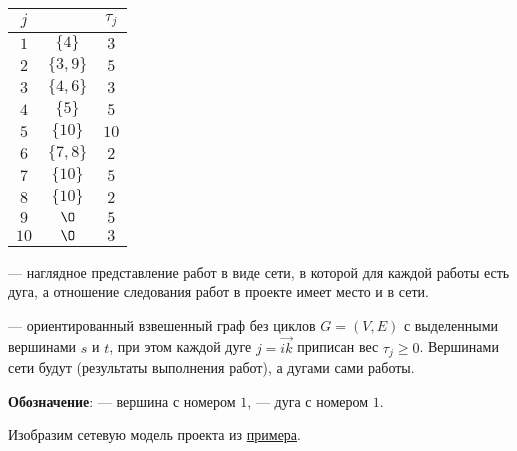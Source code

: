 \begin{table}[H]
	\centering
	\begin{tabular}{ | c | c | c | } 
		\hline
		$j$ & \text{следующие работы} & $\tau_j$ \\ \hline
		$1$ & $\{4\}$ & $3$ \\ \hline
		$2$ & $\{3, 9\}$ & $5$ \\ \hline
		$3$ & $\{4, 6\}$ & $3$ \\ \hline
		$4$ & $\{5\}$ & $5$ \\ \hline
		$5$ & $\{10\}$ & $10$ \\ \hline
		$6$ & $\{7, 8\}$ & $2$ \\ \hline
		$7$ & $\{10\}$ & $5$ \\ \hline
		$8$ & $\{10\}$ & $2$ \\ \hline
		$9$ & $\O$ & $5$ \\ \hline
		$10$ & $\O$ & $3$ \\ \hline
	\end{tabular}
\end{table}


 --- наглядное представление работ в виде сети, в которой для каждой работы есть дуга, а отношение следования работ в проекте имеет место и в сети.

 --- ориентированный взвешенный граф без циклов $G = (V, E)$ с выделенными вершинами $s$ и $t$, при этом каждой дуге $j = \vec{ik}$ приписан вес $\tau_j \ge 0$. Вершинами сети будут  (результаты выполнения работ), а дугами сами работы.

\textbf{Обозначение}:  --- вершина с номером $1$,  --- дуга с номером $1$.

\example

Изобразим сетевую модель проекта из \hyperref[ex:office_project]{примера}.

